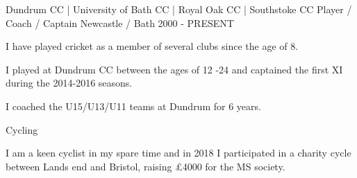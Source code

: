 \begin{cventries}

  \cventry
    {Dundrum CC | University of Bath CC | Royal Oak CC | Southstoke CC}
    {Player / Coach / Captain}
    {Newcastle / Bath}
    {2000 - PRESENT}
    {
      \begin{cvitems}
        \item {I have played cricket as a member of several clubs since the age of 8. }
        \item {I played at Dundrum CC between the ages of 12 -24 and captained the first XI during the 2014-2016 seasons.}
        \item {I coached the U15/U13/U11 teams at Dundrum for 6 years.}
      \end{cvitems}
    }
 
  \cventry
    {}
    {Cycling}
    {}
    {}
    {
      \begin{cvitems}
		I am a keen cyclist in my spare time and in 2018 I participated in a charity cycle between Lands end and Bristol, raising £4000 for the MS society.
      \end{cvitems}
    }
           
\end{cventries}

